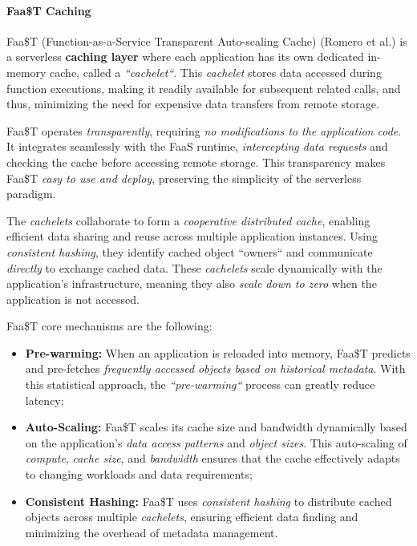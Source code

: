 \paragraph{Faa\$T Caching}
Faa\$T (Function-as-a-Service Transparent Auto-scaling Cache) (Romero et al.\cite{faast_caching}) is a serverless \textbf{caching layer} where each application has its own dedicated in-memory cache, called a \textit{``cachelet``}. This \textit{cachelet} stores data accessed during function executions, making it readily available for subsequent related calls, and thus, minimizing the need for expensive data transfers from remote storage.\

Faa\$T operates \textit{transparently}, requiring \textit{no modifications to the application code}. It integrates seamlessly with the FaaS runtime, \textit{intercepting data requests} and checking the cache before accessing remote storage. This transparency makes Faa\$T \textit{easy to use and deploy}, preserving the simplicity of the serverless paradigm.\

The \textit{cachelets} collaborate to form a \textit{cooperative distributed cache}, enabling efficient data sharing and reuse across multiple application instances. Using \textit{consistent hashing}, they identify cached object ``owners`` and communicate \textit{directly} to exchange cached data. These \textit{cachelets} scale dynamically with the application's infrastructure, meaning they also \textit{scale down to zero} when the application is not accessed.

Faa\$T core mechanisms are the following:
\begin{itemize}
\item \textbf{Pre-warming:} When an application is reloaded into memory, Faa\$T predicts and pre-fetches \textit{frequently accessed objects based on historical metadata}. With this statistical approach, the \textit{``pre-warming``} process can greatly reduce latency;
\item \textbf{Auto-Scaling:} Faa\$T scales its cache size and bandwidth dynamically based on the application's \textit{data access patterns} and \textit{object sizes}. This auto-scaling of \textit{compute}, \textit{cache size}, and \textit{bandwidth} ensures that the cache effectively adapts to changing workloads and data requirements;
\item \textbf{Consistent Hashing:} Faa\$T uses \textit{consistent hashing} to distribute cached objects across multiple \textit{cachelets}, ensuring efficient data finding and minimizing the overhead of metadata management.
\end{itemize}

